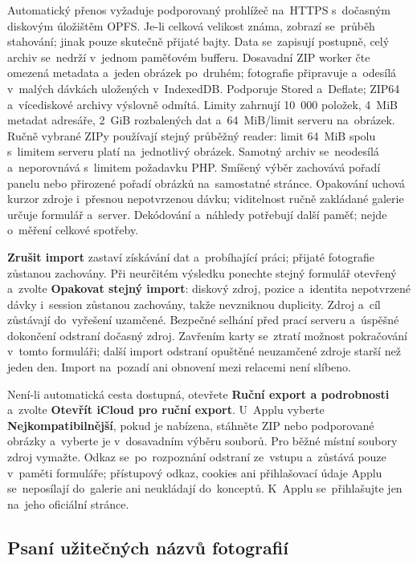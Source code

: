 \documentclass[11pt,a4paper]{article}
\newcommand{\ui}[1]{\textbf{#1}}
\begin{document}
Automatický přenos vyžaduje podporovaný prohlížeč na~HTTPS s~dočasným diskovým
úložištěm OPFS. Je-li celková velikost známa, zobrazí se~průběh stahování;
jinak pouze skutečně přijaté bajty. Data se~zapisují postupně, celý archiv
se~nedrží v~jednom paměťovém bufferu. Dosavadní ZIP worker čte omezená metadata
a~jeden obrázek po~druhém; fotografie připravuje a~odesílá v~malých dávkách
uložených v~IndexedDB. Podporuje Stored a~Deflate; ZIP64 a~vícediskové archivy
výslovně odmítá. Limity zahrnují 10~000 položek, 4~MiB metadat adresáře, 2~GiB
rozbalených dat a~64~MiB/limit serveru na~obrázek. Ručně vybrané ZIPy používají
stejný průběžný reader: limit 64~MiB spolu s~limitem serveru platí
na~jednotlivý obrázek. Samotný archiv se~neodesílá a~neporovnává s~limitem
požadavku PHP. Smíšený výběr zachovává pořadí panelu nebo přirozené pořadí
obrázků na~samostatné stránce. Opakování uchová kurzor zdroje i~přesnou
nepotvrzenou dávku; viditelnost ručně zakládané galerie určuje formulář
a~server. Dekódování a~náhledy potřebují další paměť; nejde o~měření celkové
spotřeby.

\ui{Zrušit import} zastaví získávání dat a~probíhající práci; přijaté fotografie
zůstanou zachovány. Při neurčitém výsledku ponechte stejný formulář otevřený
a~zvolte \ui{Opakovat stejný import}: diskový zdroj, pozice a~identita
nepotvrzené dávky i~session zůstanou zachovány, takže nevzniknou duplicity.
Zdroj a~cíl zůstávají do~vyřešení uzamčené. Bezpečné selhání před prací serveru
a~úspěšné dokončení odstraní dočasný zdroj. Zavřením karty se~ztratí možnost
pokračování v~tomto formuláři; další import odstraní opuštěné neuzamčené zdroje
starší než jeden den. Import na~pozadí ani obnovení mezi relacemi není slíbeno.

Není-li automatická cesta dostupná, otevřete \ui{Ruční export a podrobnosti}
a~zvolte \ui{Otevřít iCloud pro ruční export}. U~Applu vyberte
\ui{Nejkompatibilnější}, pokud je nabízena, stáhněte ZIP nebo podporované
obrázky a~vyberte je v~dosavadním výběru souborů. Pro běžné místní soubory zdroj
vymažte. Odkaz se~po~rozpoznání odstraní ze~vstupu a~zůstává pouze v~paměti
formuláře; přístupový odkaz, cookies ani přihlašovací údaje Applu se~neposílají
do~galerie ani neukládají do~konceptů. K~Applu se~přihlašujte jen na~jeho
oficiální stránce.

\subsection{Psaní užitečných názvů fotografií}
\end{document}
